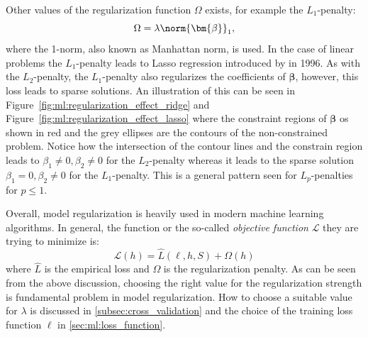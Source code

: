 Other values of the regularization function $\Omega$ exists, for example the $L_1$-penalty:
\begin{equation}
  \Omega = \lambda \norm{\bm{\beta}}_1, 
\end{equation}
where the 1-norm, also known as Manhattan norm, is used. In the case of linear problems the $L_1$-penalty leads to Lasso regression introduced by \citet{tibshiraniRegressionShrinkageSelection1996} in \num{1996}. As with the $L_2$-penalty, the $L_1$-penalty also regularizes the coefficients of $\bm{\beta}$, however, this loss leads to sparse solutions. An illustration of this can be seen in Figure~\ref{fig:ml:regularization_effect_ridge} and Figure~\ref{fig:ml:regularization_effect_lasso} where the constraint regions of $\bm{\beta}$ os shown in red and the grey ellipses are the contours of the non-constrained problem. Notice how the intersection of the contour lines and the constrain region leads to $\beta_1 \neq 0, \beta_2 \neq 0$ for the $L_2$-penalty whereas it leads to the sparse solution $\beta_1=0, \beta_2 \neq 0$ for the $L_1$-penalty. This is a general pattern seen for $L_p$-penalties for $p \leq 1$.

Overall, model regularization is heavily used in modern machine learning algorithms. In general, the function or the so-called \emph{objective function} $\mathcal{L}$ they are trying to minimize is:
\begin{equation}
  \mathcal{L}(h) = \hat{L}(\ell, h, S) + \Omega(h)
\end{equation}
where $\hat{L}$ is the empirical loss and $\Omega$ is the regularization penalty. As can be seen from the above discussion, choosing the right value for the regularization strength is fundamental problem in model regularization. How to choose a suitable value for $\lambda$ is discussed in \autoref{subsec:cross_validation} and the choice of the training loss function $\ell$ in \autoref{sec:ml:loss_function}. 

